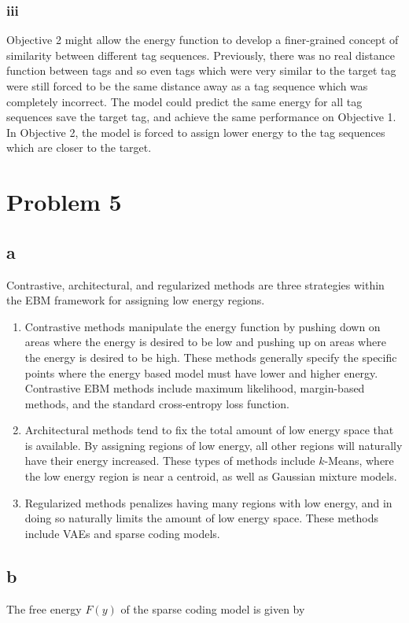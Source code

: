 \documentclass{article}
\begin{document}
\subsubsection{iii}
Objective 2 might allow the energy function to develop a finer-grained concept of similarity between different tag sequences. Previously, there was no real distance function between tags and so even tags which were very similar to the target tag were still forced to be the same distance away as a tag sequence which was completely incorrect. The model could predict the same energy for all tag sequences save the target tag, and achieve the same performance on Objective 1. In Objective 2, the model is forced to assign lower energy to the tag sequences which are closer to the target.

\section{Problem 5}
\subsection{a}
Contrastive, architectural, and regularized methods are three strategies within the EBM framework for assigning low energy regions.

\begin{enumerate}
    \item Contrastive methods manipulate the energy function by pushing down on areas where the energy is desired to be low and pushing up on areas where the energy is desired to be high. These methods generally specify the specific points where the energy based model must have lower and higher energy. Contrastive EBM methods include maximum likelihood, margin-based methods, and the standard cross-entropy loss function.
    \item Architectural methods tend to fix the total amount of low energy space that is available. By assigning regions of low energy, all other regions will naturally have their energy increased. These types of methods include $k$-Means, where the low energy region is near a centroid, as well as Gaussian mixture models.
    \item Regularized methods penalizes having many regions with low energy, and in doing so naturally limits the amount of low energy space. These methods include VAEs and sparse coding models.
\end{enumerate}

\subsection{b}
The free energy $F(y)$ of the sparse coding model is given by
\end{document}
